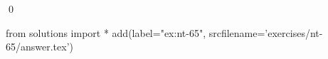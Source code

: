 
\begin{ex} 
  \label{ex:nt-65}
  
  \qed
\end{ex} 
\begin{python0}
from solutions import *
add(label="ex:nt-65",
    srcfilename='exercises/nt-65/answer.tex') 
\end{python0}
